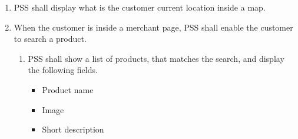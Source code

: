 \begin{enumerate}[label=SY-\arabic*]
\begin{enumerate}[label=SY-6.\arabic*]
    \end{enumerate}
    \item PSS shall display what is the customer current location 
    inside a map.
    \item When the customer is inside a merchant page, PSS shall enable the 
    customer to search a product.
    \begin{enumerate}[label=SY-8.\arabic*]
        \item PSS shall show a list of products, that matches the search, 
        and display the following fields.
        \begin{itemize}
            \item Product name
            \item Image 
            \item Short description
        \end{itemize}
    \end{enumerate}
    \end{enumerate}
